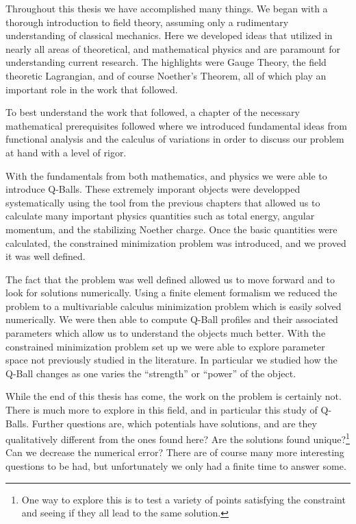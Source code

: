 Throughout this thesis we have accomplished many things. We began with a
thorough introduction to field theory, assuming only a rudimentary understanding
of classical mechanics. Here we developed ideas that utilized in nearly all
areas of theoretical, and mathematical physics and are paramount for
understanding current research. The highlights were Gauge Theory, the field
theoretic Lagrangian, and of course Noether's Theorem, all of which play an
important role in the work that followed.

To best understand the work that followed, a chapter of the necessary
mathematical prerequisites followed where we introduced fundamental ideas from
functional analysis and the calculus of variations in order to discuss our
problem at hand with a level of rigor.

With the fundamentals from both mathematics, and physics we were able to
introduce Q-Balls. These extremely imporant objects were developped
systematically using the tool from the previous chapters that allowed us to
calculate many important physics quantities such as total energy, angular
momentum, and the stabilizing Noether charge. Once the basic quantities were
calculated, the constrained minimization problem was introduced, and we proved
it was well defined.

The fact that the problem was well defined allowed us to move forward and to
look for solutions numerically. Using a finite element formalism we reduced the
problem to a multivariable calculus minimization problem which is easily solved
numerically. We were then able to compute Q-Ball profiles and their associated
parameters which allow us to understand the objects much better. With the
constrained minimization problem set up we were able to explore parameter space
not previously studied in the literature. In particular we studied how the
Q-Ball changes as one varies the ``strength'' or ``power'' of the object.

While the end of this thesis has come, the work on the problem is certainly not.
There is much more to explore in this field, and in particular this study of
Q-Balls. Further questions are, which potentials have solutions, and are they
qualitatively different from the ones found here? Are the solutions found
unique?\footnote{One way to explore this is to test a variety of points
    satisfying the constraint and seeing if they all lead to the same solution.} Can
we decrease the numerical error? There are of course many more interesting
questions to be had, but unfortunately we only had a finite time to answer some.